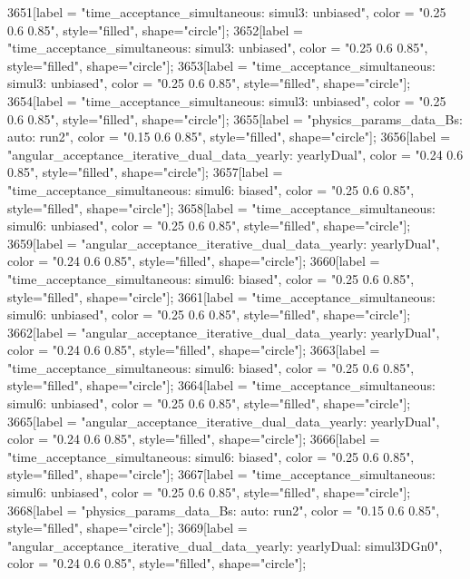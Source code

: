 {	3651[label = "time_acceptance_simultaneous\ntimeacc: simul3\ntrigger: unbiased", color = "0.25 0.6 0.85", style="filled", shape="circle"];
	3652[label = "time_acceptance_simultaneous\ntimeacc: simul3\ntrigger: unbiased", color = "0.25 0.6 0.85", style="filled", shape="circle"];
	3653[label = "time_acceptance_simultaneous\ntimeacc: simul3\ntrigger: unbiased", color = "0.25 0.6 0.85", style="filled", shape="circle"];
	3654[label = "time_acceptance_simultaneous\ntimeacc: simul3\ntrigger: unbiased", color = "0.25 0.6 0.85", style="filled", shape="circle"];
	3655[label = "physics_params_data_Bs\nfit: auto\nyear: run2", color = "0.15 0.6 0.85", style="filled", shape="circle"];
	3656[label = "angular_acceptance_iterative_dual_data_yearly\nangacc: yearlyDual", color = "0.24 0.6 0.85", style="filled", shape="circle"];
	3657[label = "time_acceptance_simultaneous\ntimeacc: simul6\ntrigger: biased", color = "0.25 0.6 0.85", style="filled", shape="circle"];
	3658[label = "time_acceptance_simultaneous\ntimeacc: simul6\ntrigger: unbiased", color = "0.25 0.6 0.85", style="filled", shape="circle"];
	3659[label = "angular_acceptance_iterative_dual_data_yearly\nangacc: yearlyDual", color = "0.24 0.6 0.85", style="filled", shape="circle"];
	3660[label = "time_acceptance_simultaneous\ntimeacc: simul6\ntrigger: biased", color = "0.25 0.6 0.85", style="filled", shape="circle"];
	3661[label = "time_acceptance_simultaneous\ntimeacc: simul6\ntrigger: unbiased", color = "0.25 0.6 0.85", style="filled", shape="circle"];
	3662[label = "angular_acceptance_iterative_dual_data_yearly\nangacc: yearlyDual", color = "0.24 0.6 0.85", style="filled", shape="circle"];
	3663[label = "time_acceptance_simultaneous\ntimeacc: simul6\ntrigger: biased", color = "0.25 0.6 0.85", style="filled", shape="circle"];
	3664[label = "time_acceptance_simultaneous\ntimeacc: simul6\ntrigger: unbiased", color = "0.25 0.6 0.85", style="filled", shape="circle"];
	3665[label = "angular_acceptance_iterative_dual_data_yearly\nangacc: yearlyDual", color = "0.24 0.6 0.85", style="filled", shape="circle"];
	3666[label = "time_acceptance_simultaneous\ntimeacc: simul6\ntrigger: biased", color = "0.25 0.6 0.85", style="filled", shape="circle"];
	3667[label = "time_acceptance_simultaneous\ntimeacc: simul6\ntrigger: unbiased", color = "0.25 0.6 0.85", style="filled", shape="circle"];
	3668[label = "physics_params_data_Bs\nfit: auto\nyear: run2", color = "0.15 0.6 0.85", style="filled", shape="circle"];
	3669[label = "angular_acceptance_iterative_dual_data_yearly\nangacc: yearlyDual\ntimeacc: simul3DGn0", color = "0.24 0.6 0.85", style="filled", shape="circle"];
}
